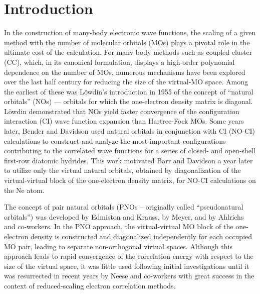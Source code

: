 \section{Introduction}
In the construction of many-body electronic wave functions, the scaling of a
given method with the number of molecular orbitals (MOs) plays a pivotal role
in the ultimate cost of the calculation.  For many-body methods such as
coupled cluster (CC),\cite{Crawford00, Gauss98, Shavitt09} which, in its
canonical formulation, displays a high-order polynomial dependence on the
number of MOs, numerous mechanisms have been explored over the last half
century for reducing the size of the virtual-MO space.  Among the earliest of
these was L{\"o}wdin's\cite{Lowdin55} introduction in 1955 of the concept of
``natural orbitals'' (NOs) --- orbitals for which the one-electron density
matrix is diagonal.  L\"owdin demonstrated that NOs yield faster convergence
of the configuration interaction (CI) wave function expansion than Hartree-Fock MOs.  Some years later,
Bender and Davidson\cite{Bender69} used natural orbitals in conjunction with
CI (NO-CI) calculations to construct and analyze the most important
configurations contributing to the correlated wave functions for a series of
closed- and open-shell first-row diatomic hydrides.  This work motivated Barr
and Davidson a year later\cite{Barr70} to utilize only the virtual natural
orbitals, obtained by diagonalization of the virtual-virtual block of
the one-electron density matrix, for NO-CI calculations on the Ne atom.

The concept of pair natural orbitals (PNOs -- originally called
``pseudonatural orbitals'') was developed by Edmiston and
Krauss\cite{Edmiston66}, by Meyer\cite{Meyer73}, and by Ahlrichs and
co-workers\cite{Ahlrichs75}. In the PNO approach, the virtual-virtual MO block
of the one-electron density is constructed and diagonalized independently for
each occupied MO pair, leading to separate non-orthogonal virtual spaces.
Although this approach leads to rapid convergence of the correlation energy
with respect to the size of the virtual space, it was little used following
initial investigations until it was resurrected in recent years by Neese and
co-workers with great success in the context of reduced-scaling electron
correlation methods\cite{Neese09,Riplinger16}.

